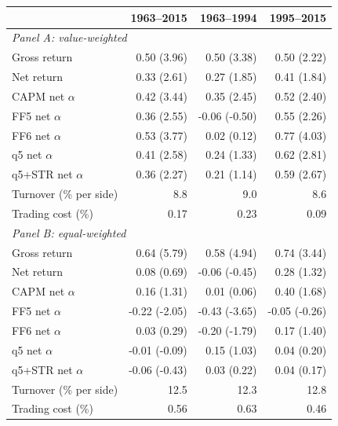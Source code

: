 \begin{tabular}{lrrr}
\toprule
 & 1963--2015 & 1963--1994 & 1995--2015 \\
\midrule
\multicolumn{4}{l}{\textit{Panel A: value-weighted}} \\
Gross return & 0.50 (3.96) & 0.50 (3.38) & 0.50 (2.22) \\
Net return & 0.33 (2.61) & 0.27 (1.85) & 0.41 (1.84) \\
CAPM net $\alpha$ & 0.42 (3.44) & 0.35 (2.45) & 0.52 (2.40) \\
FF5 net $\alpha$ & 0.36 (2.55) & -0.06 (-0.50) & 0.55 (2.26) \\
FF6 net $\alpha$ & 0.53 (3.77) & 0.02 (0.12) & 0.77 (4.03) \\
q5 net $\alpha$ & 0.41 (2.58) & 0.24 (1.33) & 0.62 (2.81) \\
q5+STR net $\alpha$ & 0.36 (2.27) & 0.21 (1.14) & 0.59 (2.67) \\
Turnover (\% per side) & 8.8 & 9.0 & 8.6 \\
Trading cost (\%) & 0.17 & 0.23 & 0.09 \\
\midrule
\multicolumn{4}{l}{\textit{Panel B: equal-weighted}} \\
Gross return & 0.64 (5.79) & 0.58 (4.94) & 0.74 (3.44) \\
Net return & 0.08 (0.69) & -0.06 (-0.45) & 0.28 (1.32) \\
CAPM net $\alpha$ & 0.16 (1.31) & 0.01 (0.06) & 0.40 (1.68) \\
FF5 net $\alpha$ & -0.22 (-2.05) & -0.43 (-3.65) & -0.05 (-0.26) \\
FF6 net $\alpha$ & 0.03 (0.29) & -0.20 (-1.79) & 0.17 (1.40) \\
q5 net $\alpha$ & -0.01 (-0.09) & 0.15 (1.03) & 0.04 (0.20) \\
q5+STR net $\alpha$ & -0.06 (-0.43) & 0.03 (0.22) & 0.04 (0.17) \\
Turnover (\% per side) & 12.5 & 12.3 & 12.8 \\
Trading cost (\%) & 0.56 & 0.63 & 0.46 \\
\bottomrule
\end{tabular}
